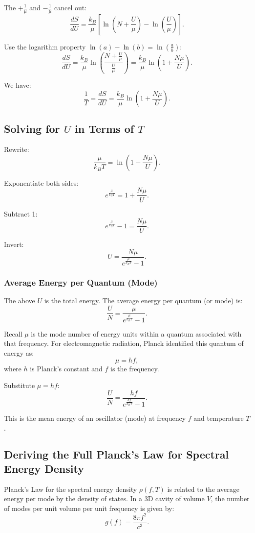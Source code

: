 \documentclass{report}
\begin{document}
The $+\frac{1}{\mu}$ and $-\frac{1}{\mu}$ cancel out:
\[
\frac{dS}{dU} = \frac{k_B}{\mu}\left[\ln\left(N + \frac{U}{\mu}\right) - \ln\left(\frac{U}{\mu}\right)\right].
\]

Use the logarithm property $\ln(a) - \ln(b) = \ln\left(\frac{a}{b}\right)$:
\[
\frac{dS}{dU} = \frac{k_B}{\mu}\ln\left(\frac{N + \frac{U}{\mu}}{\frac{U}{\mu}}\right) = \frac{k_B}{\mu}\ln\left(1 + \frac{N\mu}{U}\right).
\]

We have:
\[
\frac{1}{T} = \frac{dS}{dU} = \frac{k_B}{\mu}\ln\left(1 + \frac{N\mu}{U}\right).
\]

\subsection*{Solving for $U$ in Terms of $T$}

Rewrite:
\[
\frac{\mu}{k_B T} = \ln\left(1 + \frac{N\mu}{U}\right).
\]

Exponentiate both sides:
\[
e^{\frac{\mu}{k_B T}} = 1 + \frac{N\mu}{U}.
\]

Subtract 1:
\[
e^{\frac{\mu}{k_B T}} - 1 = \frac{N\mu}{U}.
\]

Invert:
\[
U = \frac{N\mu}{e^{\frac{\mu}{k_B T}} - 1}.
\]

\subsubsection*{Average Energy per Quantum (Mode)}

The above $U$ is the total energy. The average energy per quantum (or mode) is:
\[
\frac{U}{N} = \frac{\mu}{e^{\frac{\mu}{k_B T}} - 1}.
\]

Recall $\mu$ is the mode number of energy units within a quantum associated with that frequency. For electromagnetic radiation, Planck identified this quantum of energy as:
\[
\mu = hf,
\]
where $h$ is Planck’s constant and $f$ is the frequency.

Substitute $\mu = hf$:
\[
\frac{U}{N} = \frac{hf}{e^{\frac{hf}{k_B T}} - 1}.
\]

This is the mean energy of an oscillator (mode) at frequency $f$ and temperature $T$.

\subsection*{Deriving the Full Planck’s Law for Spectral Energy Density}

Planck’s Law for the spectral energy density $\rho(f,T)$ is related to the average energy per mode by the density of states. In a 3D cavity of volume $V$, the number of modes per unit volume per unit frequency is given by:
\[
g(f) = \frac{8\pi f^2}{c^3}.
\]
\end{document}
